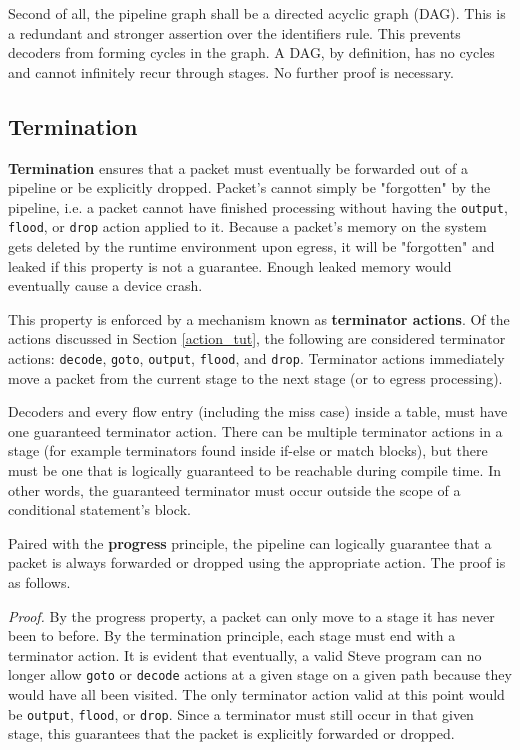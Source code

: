 Second of all, the pipeline graph shall be a directed acyclic graph (DAG). This is a redundant and stronger assertion over the identifiers rule. This prevents decoders from forming cycles in the graph. A DAG, by definition, has no cycles and cannot infinitely recur through stages. No further proof is necessary.

\subsection{Termination} \label{termination_guide}

\textbf{Termination} ensures that a packet must eventually be forwarded out of a pipeline or be explicitly dropped. Packet's cannot simply be "forgotten" by the pipeline, i.e. a packet cannot have finished processing without having the \texttt{output}, \texttt{flood}, or \texttt{drop} action applied to it. Because a packet's memory on the system gets deleted by the runtime environment upon egress, it will be "forgotten" and leaked if this property is not a guarantee. Enough leaked memory would eventually cause a device crash.

This property is enforced by a mechanism known as \textbf{terminator actions}. Of the actions discussed in Section \ref{action_tut}, the following are considered terminator actions: \texttt{decode}, \texttt{goto}, \texttt{output}, \texttt{flood}, and \texttt{drop}. Terminator actions immediately move a packet from the current stage to the next stage (or to egress processing). 

Decoders and every flow entry (including the miss case) inside a table, must have one guaranteed terminator action. There can be multiple terminator actions in a stage (for example terminators found inside if-else or match blocks), but there must be one that is logically guaranteed to be reachable during compile time. In other words, the guaranteed terminator must occur outside the scope of a conditional statement's block.

Paired with the \textbf{progress} principle, the pipeline can logically guarantee that a packet is always forwarded or dropped using the appropriate action. The proof is as follows.

\textit{Proof.} By the progress property, a packet can only move to a stage it has never been to before. By the termination principle, each stage must end with a terminator action. It is evident that eventually, a valid Steve program can no longer allow \texttt{goto} or \texttt{decode} actions at a given stage on a given path because they would have all been visited. The only terminator action valid at this point would be \texttt{output}, \texttt{flood}, or \texttt{drop}. Since a terminator must still occur in that given stage, this guarantees that the packet is explicitly forwarded or dropped.

